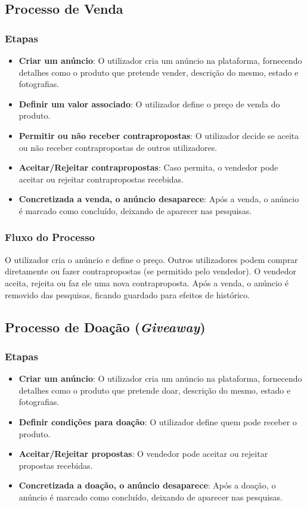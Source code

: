 \documentclass[a4paper, 12pt]{article} %
\begin{document}
\subsection{Processo de Venda}

\subsubsection{Etapas}
\begin{itemize}
	\item \textbf{Criar um anúncio}: O utilizador cria um anúncio na plataforma, fornecendo detalhes como o produto que pretende vender, descrição do mesmo, estado e fotografias.
	\item \textbf{Definir um valor associado}: O utilizador define o preço de venda do produto.
	\item \textbf{Permitir ou não receber contrapropostas}: O utilizador decide se aceita ou não receber contrapropostas de outros utilizadores.
	\item \textbf{Aceitar/Rejeitar contrapropostas}: Caso permita, o vendedor pode aceitar ou rejeitar contrapropostas recebidas.
	\item \textbf{Concretizada a venda, o anúncio desaparece}: Após a venda, o anúncio é marcado como concluído, deixando de aparecer nas pesquisas.
\end{itemize}

\subsubsection{Fluxo do Processo}
O utilizador cria o anúncio e define o preço. Outros utilizadores podem comprar diretamente ou fazer contrapropostas (se permitido pelo vendedor). O vendedor aceita, rejeita ou faz ele uma nova contraproposta. Após a venda, o anúncio é removido das pesquisas, ficando guardado para efeitos de histórico.

\subsection{Processo de Doação (\textit{Giveaway})}

\subsubsection{Etapas}
\begin{itemize}
	\item \textbf{Criar um anúncio}: O utilizador cria um anúncio na plataforma, fornecendo detalhes como o produto que pretende doar, descrição do mesmo, estado e fotografias.
	\item \textbf{Definir condições para doação}: O utilizador define quem pode receber o produto.
	\item \textbf{Aceitar/Rejeitar propostas}: O vendedor pode aceitar ou rejeitar propostas recebidas.
	\item \textbf{Concretizada a doação, o anúncio desaparece}: Após a doação, o anúncio é marcado como concluído, deixando de aparecer nas pesquisas.
\end{itemize}
\end{document}
